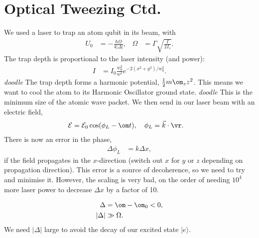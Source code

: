 \documentclass[lasers.tex]{subfiles}
\begin{document}
\section{Optical Tweezing Ctd.}
We used a laser to trap an atom qubit in its beam, with
\begin{align}
    U_0 &= -\frac{\hbar\Omega}{4|\Delta|}, & \Omega &= \Gamma\sqrt{\frac{I}{2I_s}}.
\end{align} 
The trap depth is proportional to the laser intensity (and power):
\begin{align}
    I &= I_0\frac{w_0^2}{w^2}e^{-2(x^2+y^2)/w_0^2}.
\end{align}
\emph{doodle}
The trap depth forms a harmonic potential, $\frac12 m\om_zz^2$.
This means we want to cool the atom to its Harmonic Oscillator ground state.
\emph{doodle}
This is the minimum size of the atomic wave packet.
We then send in our laser beam with an electric field,
\begin{align}
    \mathcal{E} &= \mathcal{E}_0\cos(\phi_L-\om t),\quad \phi_L = \vec{k}\cdot\vr.
\end{align}
There is now an error in the phase, 
\begin{align}
    \Delta\phi_L &= k\Delta x,
\end{align}
if the field propagates in the $x$-direction (switch out $x$ for $y$ or $z$ depending on propagation direction).
This error is a source of decoherence, so we need to try and minimise it. 
However, the scaling is very bad, on the order of needing $10^4$ more laser power to decrease $\Delta x$ by a factor of 10.
\begin{figure}[H]
    \centering
\end{figure}
\vspace{-20pt}
\begin{align}
    \Delta &= \om-\om_0 < 0, \\
    |\Delta| &\gg \Omega.
\end{align}
We need $|\Delta|$ large to avoid the decay of our excited state $|e\rangle$.
\end{document}
